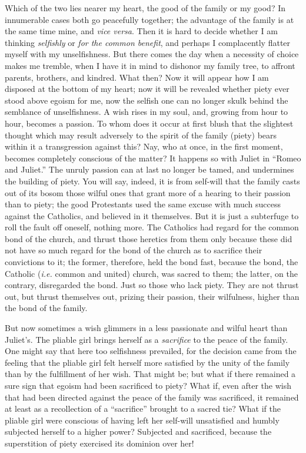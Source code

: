 \documentclass[12pt,a4paper]{book}
\begin{document}
Which of the two lies nearer my heart, the good of the family or my good? In 
innumerable cases both go peacefully together; the advantage of the family is 
at the same time mine, and \textit{vice versa}. Then it is hard to decide 
whether I am thinking \textit{selfishly} or \textit{for the common benefit}, 
and perhaps I complacently flatter myself with my unselfishness. But there 
comes the day when a necessity of choice makes me tremble, when I have it in 
mind to dishonor my family tree, to affront parents, brothers, and kindred. 
What then? Now it will appear how I am disposed at the bottom of my heart; now 
it will be revealed whether piety ever stood above egoism for me, now the 
selfish one can no longer skulk behind the semblance of unselfishness. A wish 
rises in my soul, and, growing from hour to hour, becomes a passion. To whom 
does it occur at first blush that the slightest thought which may result 
adversely to the spirit of the family (piety) bears within it a transgression 
against this? Nay, who at once, in the first moment, becomes completely 
conscious of the matter? It happens so with Juliet in ``Romeo and Juliet.'' 
The unruly passion can at last no longer be tamed, and undermines the building 
of piety. You will say, indeed, it is from self-will that the family casts out 
of its bosom those wilful ones that grant more of a hearing to their passion 
than to piety; the good Protestants used the same excuse with much success 
against the Catholics, and believed in it themselves. But it is just a 
subterfuge to roll the fault off oneself, nothing more. The Catholics had 
regard for the common bond of the church, and thrust those heretics from them 
only because these did not have so much regard for the bond of the church as 
to sacrifice their convictions to it; the former, therefore, held the bond 
fast, because the bond, the Catholic (\textit{i.e.} common and united) church, 
was sacred to them; the latter, on the contrary, disregarded the bond. Just so 
those who lack piety. They are not thrust out, but thrust themselves out, 
prizing their passion, their wilfulness, higher than the bond of the family.

But now sometimes a wish glimmers in a less passionate and wilful heart than 
Juliet's. The pliable girl brings herself as a \textit{sacrifice} to the peace 
of the family. One might say that here too selfishness prevailed, for the 
decision came from the feeling that the pliable girl felt herself more 
satisfied by the unity of the family than by the fulfillment of her wish. That 
might be; but what if there remained a sure sign that egoism had been 
sacrificed to piety? What if, even after the wish that had been directed 
against the peace of the family was sacrificed, it remained at least as a 
recollection of a ``sacrifice'' brought to a sacred tie? What if the pliable 
girl were conscious of having left her self-will unsatisfied and humbly 
subjected herself to a higher power? Subjected and sacrificed, because the 
superstition of piety exercised its dominion over her!
\end{document}
